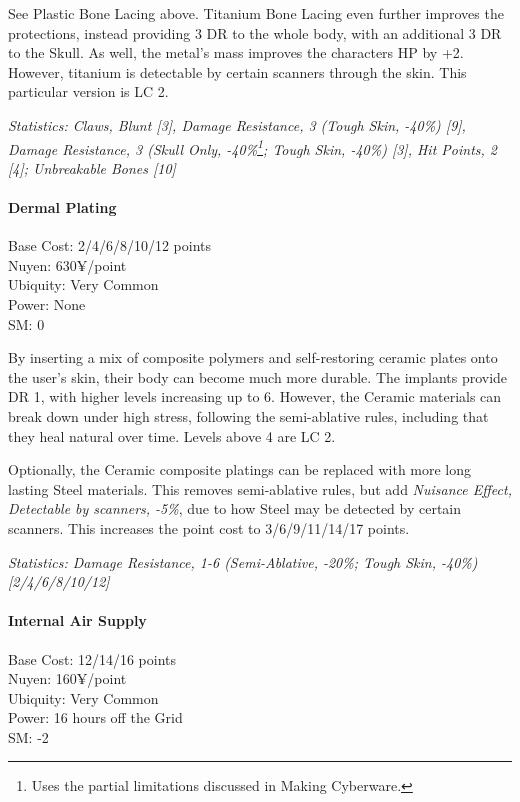 \begin{multicols*}{3}
	See Plastic Bone Lacing above. Titanium Bone Lacing even further improves the protections, instead providing 3 DR to the whole body, with an additional 3 DR to the Skull. As well, the metal's mass improves the characters HP by +2. However, titanium is detectable by certain scanners through the skin. This particular version is LC 2.
	
	\textit{\textcolor{OliveGreen}{Statistics: Claws, Blunt [3], Damage Resistance, 3 (Tough Skin, -40\%) [9], Damage Resistance, 3 (Skull Only, -40\%\footnote {Uses the partial limitations discussed in Making Cyberware.}; Tough Skin, -40\%) [3], Hit Points, 2 [4]; Unbreakable Bones [10]}}
	
	\paragraph{Dermal Plating}
	\begin{flushright}
		Base Cost: 2/4/6/8/10/12 points\\
		Nuyen: 630¥/point\\
		Ubiquity: Very Common\\
		Power: None\\
		SM: 0
	\end{flushright}
	
	By inserting a mix of composite polymers and self-restoring ceramic plates onto the user's skin, their body can become much more durable. The implants provide DR 1, with higher levels increasing up to 6. However, the Ceramic materials can break down under high stress, following the semi-ablative rules, including that they heal natural over time. Levels above 4 are LC 2.
	
	Optionally, the Ceramic composite platings can be replaced with more long lasting Steel materials. This removes semi-ablative rules, but add \textit{Nuisance Effect, Detectable by scanners, -5\%}, due to how Steel may be detected by certain scanners. This increases the point cost to 3/6/9/11/14/17 points. 
	
	\textit{\textcolor{OliveGreen}{Statistics: Damage Resistance, 1-6 (Semi-Ablative, -20\%; Tough Skin, -40\%) [2/4/6/8/10/12]}}
	
	\paragraph{Internal Air Supply}
	\begin{flushright}
		Base Cost: 12/14/16 points\\
		Nuyen: 160¥/point\\
		Ubiquity: Very Common\\
		Power: 16 hours off the Grid\\
		SM: -2
	\end{flushright}
	

\end{multicols*}
